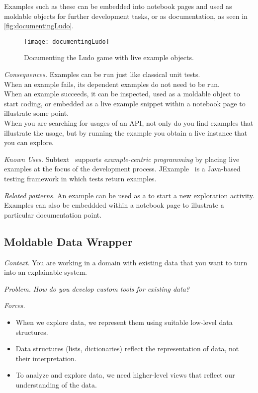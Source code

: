 \documentclass[acmsmall,screen,authorversion,nonacm]{acmart} %
\newcommand\ws[1]{\nbe{Workshop}{#1}{teal}} %
\newcommand{\pattern}[2]{\needlines{10}
\subsection*{#1}\label{pat:#2}}
\newcommand{\patref}[1]{\emph{\nameref{pat:#1}}\xspace}
\newcommand{\patsec}[1]{\noindent\textit{#1.}\xspace}
\begin{document}
Examples such as these can be embedded into notebook pages and used as moldable objects for further development tasks, or as documentation, as seen in \autoref{fig:documentingLudo}.

\begin{figure}[h]
  \texttt{[image: documentingLudo]}
  \caption{Documenting the Ludo game with live example objects.}
  \label{fig:documentingLudo}
\end{figure}

    
\patsec{Consequences}
Examples can be run just like classical unit tests.\\
When an example fails, its dependent examples do not need to be run.\\
When an example succeeds, it can be inspected, used as a moldable object to start coding, or embedded as a live example snippet within a notebook page to illustrate some point.\\
When you are searching for usages of an API, not only do you find examples that illustrate the usage, but by running the example you obtain a live instance that you can explore.

\patsec{Known Uses}
Subtext~\cite{Edwa04a} supports \emph{example-centric programming} by placing live examples at the focus of the development process.
JExample~\cite{Kuhn08a} is a Java-based testing framework in which tests return examples.

\patsec{Related patterns}
An example can be used as a \patref{MoldableObject} to start a new exploration activity.
Examples can also be embeddded within a \patref{ProjectDiary} notebook page to illustrate a particular documentation point.

\pattern{Moldable Data Wrapper}{MoldableDataWrapper}


\patsec{Context}
You are working in a domain with existing data that you want to turn into an explainable system.

\patsec{Problem}
\emph{How do you develop custom tools for existing data?}

\patsec{Forces}
\begin{itemize}[---]
\item When we explore data, we represent them using suitable low-level data structures.
\item Data structures (lists, dictionaries) reflect the representation of data, not their interpretation.
\item To analyze and explore data, we need higher-level views that reflect our understanding of the data.
\end{itemize}
\end{document}
